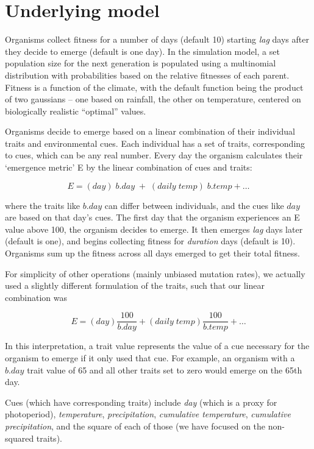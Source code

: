 \documentclass[11pt,a4paper]{article}
\begin{document}
\section{Underlying model}
Organisms collect fitness for a number of days (default 10) starting \textit{lag} days after they decide to emerge (default is one day). In the simulation model, a set population size for the next generation is populated using a multinomial distribution with probabilities based on the relative fitnesses of each parent. Fitness is a function of the climate, with the default function being the product of two gaussians -- one based on rainfall, the other on temperature, centered on biologically realistic ``optimal'' values.

Organisms decide to emerge based on a linear combination of their individual traits and environmental cues. Each individual has a set of traits, corresponding to cues, which can be any real number. Every day the organism calculates their `emergence metric' E by the linear combination of cues and traits:

\[E = (day)\;b.day\; + \;(daily\; temp)\;b.temp+\dots\] 

where the traits like $b.day$ can differ between individuals, and the cues like $day$ are based on that day's cues. The first day that the organism experiences an E value above 100, the organism decides to emerge. It then emerges \textit{lag} days later (default is one), and begins collecting fitness for \textit{duration} days (default is 10). Organisms sum up the fitness across all days emerged to get their total fitness. 

For simplicity of other operations (mainly unbiased mutation rates), we actually used a slightly different formulation of the traits, such that our linear combination was

\[E = (day)\frac{100}{b.day} + (daily\; temp)\frac{100}{b.temp}+\dots\] 

In this interpretation, a trait value represents the value of a cue necessary for the organism to emerge if it only used that cue. For example, an organism with a $b.day$ trait value of 65 and all other traits set to zero would emerge on the 65th day.

Cues (which have corresponding traits) include \textit{day} (which is a proxy for photoperiod), \textit{temperature}, \textit{precipitation}, \textit{cumulative temperature}, \textit{cumulative precipitation}, and the square of each of those (we have focused on the non-squared traits). 
\end{document}

